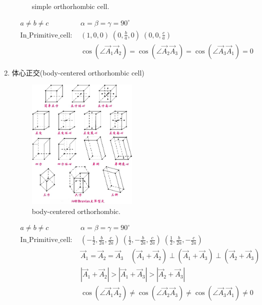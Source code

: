 \documentclass{article}      %
\begin{document}
\begin{enumerate}
\begin{figure}[h!]
\caption{\small simple orthorhombic cell.}%
\label{Bravais:orthorhombic cell}
\end{figure}
\begin{displaymath}
	\begin{aligned}
	&a\neq b\neq c &\alpha=\beta=\gamma=90^{\circ} \\
	&\mathrm{In\_Primitive\_cell}:~&(1,0,0)\;(0,\frac{b}{a},0)\;(0,0,\frac{c}{a})\\
		& &\cos(\angle\vec A_1\vec A_2)=\cos(\angle\vec A_2\vec A_3)=\cos(\angle\vec A_3\vec A_1)=0
	\end{aligned}
\end{displaymath}
		\item 体心正交(\textrm{body-centered orthorhombic cell})
\begin{figure}[h!]
\centering
\includegraphics[width=0.5\textwidth,viewport=120 330 250 460,clip]{Bravias.jpg}
\caption{\small body-centered orthorhombic.}%
\label{Bravais:orthorhombic-body-centered}
\end{figure}
\begin{displaymath}
	\begin{aligned}
	&a\neq b\neq c &\alpha=\beta=\gamma=90^{\circ} \\
	&\mathrm{In\_Primitive\_cell}:~&(-\frac12,\frac{b}{2a},\frac{c}{2a})\;(\frac12,-\frac{b}{2a},\frac{c}{2a})\;(\frac12,\frac{b}{2a},-\frac{c}{2a})\\
	& &\vec A_1=\vec A_2=\vec A_3\quad (\vec A_1+\vec A_2)\perp(\vec A_1+\vec A_3)\perp(\vec A_2+\vec A_3)\\ 
	& &|\vec A_1+\vec A_2|>|\vec A_1+\vec A_3|>|\vec A_2+\vec A_3|\\
		& &\cos(\angle\vec A_1\vec A_2)\neq\cos(\angle\vec A_2\vec A_3)\neq\cos(\angle\vec A_3\vec A_1)\neq0

\end{aligned}
\end{displaymath}
\end{enumerate}
\end{document}
